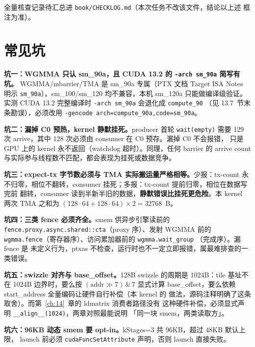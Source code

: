 全量核查记录待汇总进 \texttt{book/\allowbreak{}CHECKLOG.\allowbreak{}md}（本次任务不改该文件，结论以上述
框注为准）。

\section{常见坑}

\textbf{坑一：WGMMA 只认 sm\_90a，且 CUDA 13.2 的 \texttt{-arch sm\_90a} 简写有坑。}
WGMMA/mbarrier/TMA 是 sm\_90a 专属（PTX 文档 Target ISA Notes 明示
\texttt{sm\_90a}），sm\_100/sm\_120 均不兼容，本机 sm\_120a 只能做编译级验证。
实测 CUDA 13.2 完整编译时 \texttt{-arch sm\_90a} 会退化成 \texttt{compute\_90}
（见 13.7~节末条勘误），必须改用
\texttt{-gencode arch=\allowbreak{}compute\_\allowbreak{}90a,\allowbreak{}code=\allowbreak{}sm\_\allowbreak{}90a}。

\textbf{坑二：漏掉 C0 预热，kernel 静默挂死。}\allowbreak{}producer 首轮 \texttt{wait(empty)}
需要 129 次 arrive，其中 128 次必须由 consumer 在 C0 预存。漏掉 C0 不会报错，
只是 GPU 上的 kernel 永不返回（watchdog 超时）。同理，任何 barrier 的
arrive count 与实际参与线程数不匹配，都会表现为挂死或数据竞争。

\textbf{坑三：expect-tx 字节数必须与 TMA 实际搬运量严格相等。}少报：tx-count
永不归零，相位不翻转，consumer 挂死；多报：tx-count 提前归零，相位在数据写完前
翻转，consumer 读到半新半旧的数据，\textbf{静默错误比挂死更危险}。本 kernel
两次 TMA 之和为 $(128 \cdot 64 + 128 \cdot 64) \times 2 = 32768$~B。

\textbf{坑四：三类 fence 必须齐全。}\allowbreak{}smem 供异步引擎读前的
\texttt{fence.\allowbreak{}proxy.\allowbreak{}async.\allowbreak{}shared::\allowbreak{}cta}（proxy 序）、发射 WGMMA 前的
\texttt{wgmma.fence}（寄存器序）、访问累加器前的 \texttt{wgmma.\allowbreak{}wait\_\allowbreak{}group}
（完成序）。漏 fence 是
未定义行为，ptxas 不检查，运行时也不一定立即报错，属最难排查的一类错误。

\textbf{坑五：swizzle 对齐与 base\_offset。}\allowbreak{}128B swizzle 的周期是 1024B：tile
基址不在 1024B 边界时，要么按 $(\mathrm{addr} \gg 7) \,\&\, 7$ 显式计算
base\_offset，要么依赖 start\_address 全量编码让硬件自行补偿（本 kernel 的
做法，源码注释明确了这条取舍）。而第~\ref{ch:14}~章的 ldmatrix 消费者路径没有
这种硬件补偿，必须显式声明 \texttt{\_\allowbreak{}\_\allowbreak{}align\_\allowbreak{}\_\allowbreak{}(1024)}，两章对照最能说明
「同一块 smem，两类读取方」。

\textbf{坑六：96KB 动态 smem 要 opt-in。}\allowbreak{}kStages=3 共 96KB，超过 48KB 默认上限，
launch 前必须 \texttt{cuda\allowbreak{}Func\allowbreak{}Set\allowbreak{}Attribute} 声明，否则 launch 直接失败。

